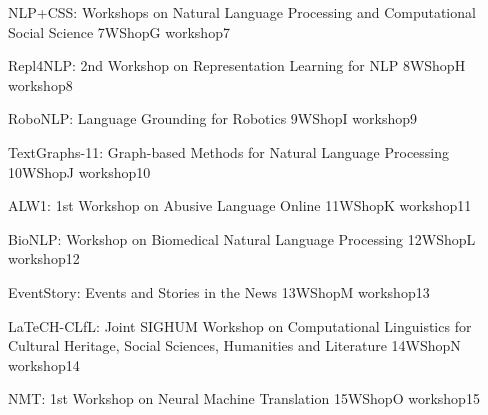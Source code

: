 \begin{wsschedule}
  {NLP+CSS: Workshops on Natural Language Processing and Computational Social Science}
  {7}{WShopG}
  {workshop7}
  {\WShopLocG}
  
\end{wsschedule}

\begin{wsschedule}
  {Repl4NLP: 2nd Workshop on Representation Learning for NLP}
  {8}{WShopH}
  {workshop8}
  {\WShopLocH}
  
\end{wsschedule}

\begin{wsschedule}
  {RoboNLP: Language Grounding for Robotics}
  {9}{WShopI}
  {workshop9}
  {\WShopLocI}
  
\end{wsschedule}

\begin{wsschedule}
  {TextGraphs-11: Graph-based Methods for Natural Language Processing}
  {10}{WShopJ}
  {workshop10}
  {\WShopLocJ}
  
\end{wsschedule}


\begin{wsschedule}
  {ALW1: 1st Workshop on Abusive Language Online}
  {11}{WShopK}
  {workshop11}
  {\WShopLocK}
  
\end{wsschedule}

\begin{wsschedule}
  {BioNLP: Workshop on Biomedical Natural Language Processing}
  {12}{WShopL}
  {workshop12}
  {\WShopLocL}
  
\end{wsschedule}

\begin{wsschedule}
  {EventStory: Events and Stories in the News}
  {13}{WShopM}
  {workshop13}
  {\WShopLocM}
  
\end{wsschedule}

\begin{wsschedule}
  {LaTeCH-CLfL: Joint SIGHUM Workshop on Computational Linguistics for Cultural Heritage, Social Sciences, Humanities and Literature}
  {14}{WShopN}
  {workshop14}
  {\WShopLocN}
  
\end{wsschedule}

\begin{wsschedule}
  {NMT: 1st Workshop on Neural Machine Translation}
  {15}{WShopO}
  {workshop15}
  {\WShopLocO}
  
\end{wsschedule}

\clearpage{\thispagestyle{emptyheader}\cleardoublepage}
